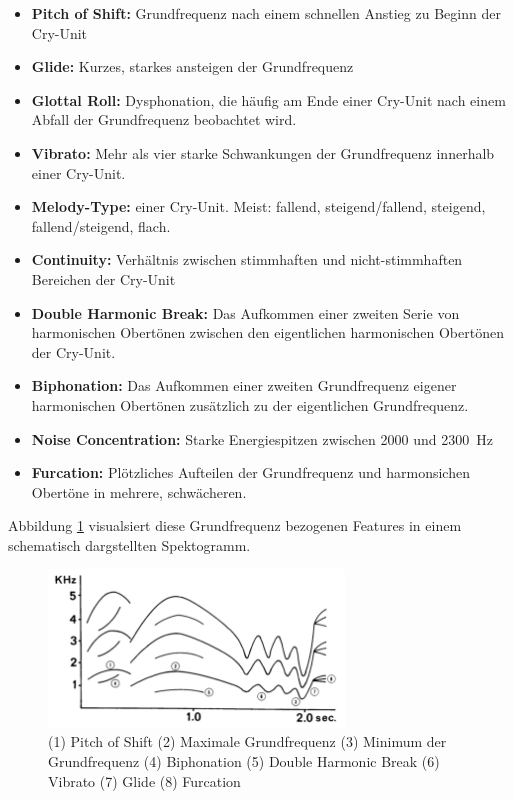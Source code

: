\begin{itemize}
\item \textbf{Pitch of Shift:} Grundfrequenz nach einem schnellen Anstieg zu Beginn der Cry-Unit
\item \textbf{Glide:} Kurzes, starkes ansteigen der Grundfrequenz
\item  \textbf{Glottal Roll:} Dysphonation, die häufig am Ende einer Cry-Unit nach einem Abfall der Grundfrequenz beobachtet wird.
\item  \textbf{Vibrato:} Mehr als vier starke Schwankungen der Grundfrequenz innerhalb einer Cry-Unit.
\item  \textbf{Melody-Type:} einer Cry-Unit. Meist: fallend, steigend/fallend, steigend, fallend/steigend, flach. 
\item  \textbf{Continuity:} Verhältnis zwischen stimmhaften und nicht-stimmhaften Bereichen der Cry-Unit
\item  \textbf{Double Harmonic Break:} Das Aufkommen einer zweiten Serie von harmonischen Obertönen zwischen den eigentlichen harmonischen Obertönen der Cry-Unit.
\item  \textbf{Biphonation:} Das Aufkommen einer zweiten Grundfrequenz eigener harmonischen Obertönen zusätzlich zu der eigentlichen Grundfrequenz.
\item  \textbf{Noise Concentration:} Starke Energiespitzen zwischen 2000 und \SI{2300}{\hertz}
\item  \textbf{Furcation:} Plötzliches Aufteilen der Grundfrequenz und harmonsichen Obertöne in mehrere, schwächeren.
\end{itemize}

Abbildung \ref{img:cryMelodies} visualsiert diese Grundfrequenz bezogenen Features in einem schematisch dargstellten Spektogramm.

\begin{figure}
	\centering
	\includegraphics[width=0.7\textwidth]{bilder/melodyTypes.png}
	\caption{(1) Pitch of Shift (2) Maximale Grundfrequenz (3) Minimum der Grundfrequenz (4) Biphonation (5) Double Harmonic Break (6) Vibrato (7) Glide (8) Furcation \cite[S. 142]{signal}}
	\label{img:cryMelodies}
\end{figure}

